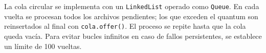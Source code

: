 La cola circular se implementa con un \texttt{LinkedList} operado como
\texttt{Queue}. En cada vuelta se procesan todos los archivos pendientes;
los que exceden el quantum son reinsertados al final con \texttt{cola.offer()}.
El proceso se repite hasta que la cola queda vacía. Para evitar bucles infinitos
en caso de fallos persistentes, se establece un límite de 100 vueltas.
